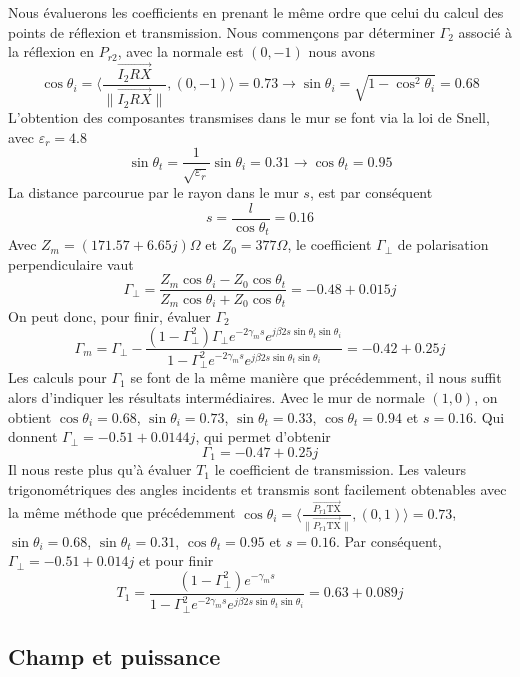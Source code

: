 Nous {\'e}valuerons les coefficients en prenant le m{\^e}me ordre que celui du
calcul des points de r{\'e}flexion et transmission. Nous commençons par d{\'e}terminer
$\Gamma_2$ associ{\'e} {\`a} la r{\'e}flexion en $P_{r 2}$, avec la normale est
$(0, - 1)$ nous avons 
\[ \cos \theta_i = \langle \frac{\overrightarrow{I_2 R X}}{\|
   \overrightarrow{I_2 R X} \|}, (0, - 1) \rangle = 0.73 \rightarrow \sin
   \theta_i = \sqrt{1 - \cos^2 \theta_i} = 0.68 \]
L'obtention des composantes transmises dans le mur se font via la loi de
Snell, avec $\varepsilon_r = 4.8$
\[ \sin \theta_t = \frac{1}{\sqrt{\varepsilon_r}} \sin \theta_i = 0.31
   \rightarrow \cos \theta_t = 0.95 \]
La distance parcourue par le rayon dans le mur $s$, est par cons{\'e}quent
\[ s = \frac{l}{\cos \theta_t} = 0.16 \]
Avec $Z_m = (171.57 + 6.65 j){\Omega}$ et $Z_0 = 377 \Omega$, le coefficient
$\Gamma_{\perp}$ de polarisation perpendiculaire vaut
\[ \Gamma_{\perp} = \frac{Z_m \cos \theta_i - Z_0 \cos \theta_t}{Z_m \cos
   \theta_i + Z_0 \cos \theta_t} = - 0.48 + 0.015 j \]
On peut donc, pour finir, {\'e}valuer $\Gamma_2$
\[ \Gamma_m = \Gamma_{\perp} - \frac{(1 - \Gamma_{\perp}^2) \Gamma_{\perp}
   e^{- 2 \gamma_m s} e^{j \beta 2 s \sin \theta_t \sin \theta_i}}{1 -
   \Gamma_{\perp}^2 e^{- 2 \gamma_m s} e^{j \beta 2 s \sin \theta_t \sin
   \theta_i}} = - 0.42 + 0.25 j \]
Les calculs pour $\Gamma_1$ se font de la m{\^e}me mani{\`e}re que
pr{\'e}c{\'e}demment, il nous suffit alors d'indiquer les r{\'e}sultats
interm{\'e}diaires.
Avec le mur de normale $(1, 0)$, on obtient $\cos \theta_i = 0.68$, $\sin
\theta_i = 0.73$, $\sin \theta_t = 0.33$, $\cos \theta_t = 0.94$ et $s = 0.16$.
Qui donnent $\Gamma_{\perp} = - 0.51 + 0.0144 j$, qui permet d'obtenir
\[ \Gamma_1 = - 0.47 + 0.25 j \]
Il nous reste plus qu'{\`a} {\'e}valuer $T_1$ le coefficient de transmission.
Les valeurs trigonom{\'e}triques des angles incidents et transmis sont
facilement obtenables avec la m{\^e}me m{\'e}thode que pr{\'e}c{\'e}demment
$\cos \theta_i = \langle \frac{\overrightarrow{P_{r 1} \mathrm{TX}}}{\|
\overrightarrow{P_{r 1} \mathrm{TX}} \|}, (0, 1) \rangle = 0.73$, $\sin \theta_i
= 0.68$, $\sin \theta_t = 0.31$, $\cos \theta_t = 0.95$ et $s = 0.16$.
Par cons{\'e}quent, $\Gamma_{\perp} = - 0.51 + 0.014 j$ et pour finir
\[ T_1 = \frac{(1 - \Gamma_{\perp}^2) e^{- \gamma_m s}}{1 - \Gamma_{\perp}^2
   e^{- 2 \gamma_m s} e^{j \beta 2 s \sin \theta_t \sin \theta_i}} = 0.63 +
   0.089 j \]

\subsection{Champ et puissance}

